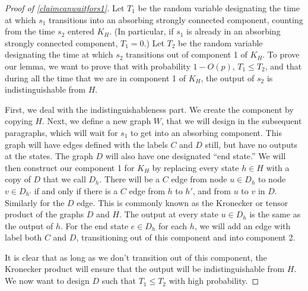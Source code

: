 \documentclass[12pt]{article}
\theoremstyle{definition}
\theoremstyle{remark}
\begin{document}
      \begin{proof}[Proof of \cref{claimcanwaitfors1}]

        Let $T_1$ be the random variable designating the time at which $s_1$ transitions into an absorbing strongly connected component, counting from the time $s_2$ entered $K_H$. (In particular, if $s_1$ is already in an absorbing strongly connected component, $T_1 = 0$.)
        Let $T_2$ be the random variable designating the time at which $s_2$ transitions out of component 1 of $K_H$.
        To prove our lemma, we want to prove that with probability $1 - O(p)$, $T_1 \leq T_2$, and that during all the time that we are in component 1 of $K_H$, the output of $s_2$ is indistinguishable from $H$.

        First, we deal with the indistinguishableness part. We create the component by copying $H$. Next, we define a new graph $W$, that we will design in the subsequent paragraphs, which will wait for $s_1$ to get into an absorbing component. This graph will have edges defined with the labels $C$ and $D$ still, but have no outputs at the states. The graph $D$ will also have one designated ``end state.'' We will then construct our component 1 for $K_H$ by replacing every state $h \in H$ with a copy of $D$ that we call $D_h$. There will be a $C$ edge from node $u \in D_h$ to node $v \in D_{h'}$ if and only if there is a $C$ edge from $h$ to $h'$, and from $u$ to $v$ in $D$. Similarly for the $D$ edge. This is commonly known as the Kronecker or tensor product of the graphs $D$ and $H$. The output at every state $u \in D_h$ is the same as the output of $h$. For the end state $e \in D_h$ for each $h$, we will add an edge with label both $C$ and $D$, transitioning out of this component and into component 2.

        It is clear that as long as we don't transition out of this component, the Kronecker product will ensure that the output will be indistinguishable from $H$. We now want to design $D$ such that $T_1 \leq T_2$ with high probability.
        

\end{proof}
\end{document}
